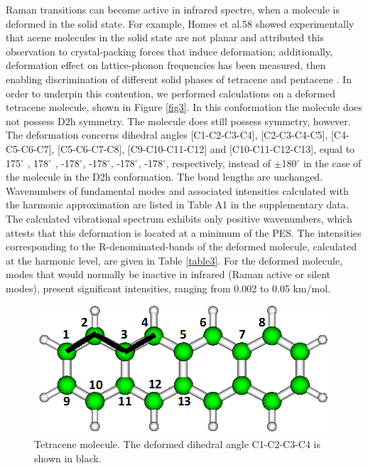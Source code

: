 Raman transitions can become active in infrared spectre, when a molecule is deformed in the solid state. For example, Homes et al.58 showed experimentally that acene molecules in the solid state are not planar and attributed this observation to crystal-packing forces that induce deformation; additionally, deformation effect on lattice-phonon frequencies has been measured, then enabling discrimination of different solid phases of tetracene \cite{venuti2004phonons} and pentacene \cite{venuti2002probing,brillante2002raman}. 
In order to underpin this contention, we performed calculations on a deformed tetracene molecule, shown in Figure \ref{fig3}. In this conformation the molecule does not possess D2h symmetry. The molecule does still possess symmetry, however. The deformation concerns dihedral angles [C1-C2-C3-C4], [C2-C3-C4-C5], [C4-C5-C6-C7], [C5-C6-C7-C8], [C9-C10-C11-C12] and [C10-C11-C12-C13], equal to 175$^{\circ}$ , 178$^{\circ}$ , -178$^{\circ}$, -178$^{\circ}$, -178$^{\circ}$, -178$^{\circ}$, respectively, instead of $\pm$180$^{\circ}$ in the case of the molecule in the D2h conformation. The bond lengths are unchanged. Wavenumbers of fundamental modes and associated intensities calculated with the harmonic approximation are listed in Table A1 in the supplementary data. The calculated vibrational spectrum exhibits only positive wavenumbers, which attests that this deformation is located at a minimum of the PES. The intensities corresponding to the R-denominated-bands of the deformed molecule, calculated at the harmonic level, are given in Table \ref{table3}. For the deformed molecule, modes that would normally be inactive in infrared (Raman active or silent modes), present significant intensities, ranging from 0.002 to 0.05 km/mol.

\begin{figure}[h]
	\centering
	\includegraphics[scale=0.6]{image/Tetracene-def}
	\caption[The deformed dihedral angle C1-C2-C3-C4 in Tetracene molecule]{Tetracene molecule. The deformed dihedral angle C1-C2-C3-C4 is shown in black.} \label{figure3}
\end{figure}

